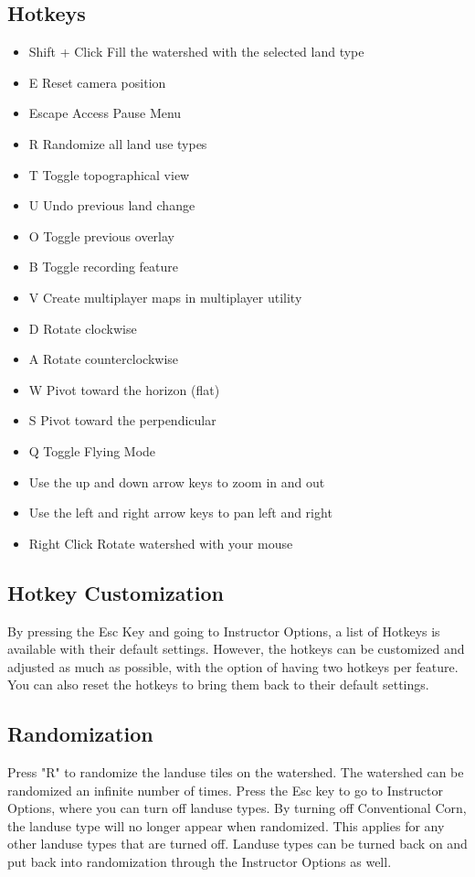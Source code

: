 \documentclass[11pt]{article}
\begin{document}
\begin{itemize}
\subsection{Hotkeys}
\begin{itemize}
\item Shift + Click	Fill the watershed with the selected land type
\item E	Reset camera position
\item Escape	Access Pause Menu
\item R	Randomize all land use types
\item T	Toggle topographical view
\item U	Undo previous land change
\item O	Toggle previous overlay
\item B	Toggle recording feature
\item V	Create multiplayer maps in multiplayer utility
\item D	Rotate clockwise
\item A	Rotate counterclockwise
\item W	Pivot toward the horizon (flat)
\item S	Pivot toward the perpendicular
\item Q	Toggle Flying Mode
\item Use the up and down arrow keys to zoom in and out
\item Use the left and right arrow keys to pan left and right
\item Right Click	Rotate watershed with your mouse
\end{itemize}

\subsection{Hotkey Customization}
By pressing the Esc Key and going to Instructor Options, a list of Hotkeys is available with their default settings. However, the hotkeys can be customized and adjusted as much as possible, with the option of having two hotkeys per feature. You can also reset the hotkeys to bring them back to their default settings. 

\subsection{Randomization}
Press "R" to randomize the landuse tiles on the watershed. The watershed can be randomized an infinite number of times. Press the Esc key to go to Instructor Options, where you can turn off landuse types. By turning off Conventional Corn, the landuse type will no longer appear when randomized. This applies for any other landuse types that are turned off. Landuse types can be turned back on and put back into randomization through the Instructor Options as well. 


\end{itemize}
\end{document}

